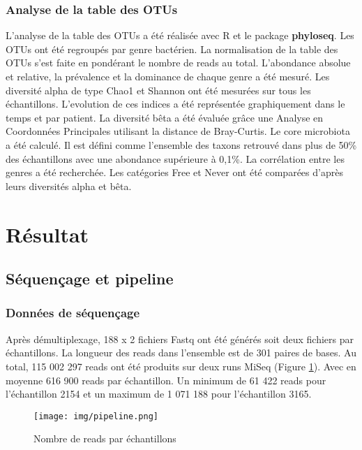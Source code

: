 \documentclass[12pt,a4paper]{article}
\begin{document}
\subsubsection{Analyse de la table des OTUs}
L’analyse de la table des OTUs a été réalisée avec R et le package \textbf{phyloseq}\cite{McMurdie2013}. Les OTUs ont été regroupés par genre bactérien. La normalisation de la table des OTUs s'est faite en pondérant le nombre de reads au total.
L'abondance absolue et relative, la prévalence et la dominance de chaque genre a été mesuré.
Les diversité alpha de type Chao1 et Shannon ont été mesurées sur tous les échantillons. L'evolution de ces indices a été représentée graphiquement dans le temps et par patient.
La diversité bêta a été évaluée grâce une Analyse en Coordonnées Principales utilisant la distance de Bray-Curtis.
Le core microbiota\cite{VanderGast2011} a été calculé. Il est défini comme l’ensemble des taxons retrouvé dans plus de 50\% des échantillons avec une abondance supérieure à 0,1\%.
La corrélation entre les genres a été recherchée.
Les catégories Free et Never ont été comparées d’après leurs diversités alpha et bêta.



\section{Résultat}
\subsection{Séquençage et pipeline}
\subsubsection{Données de séquençage}
Après démultiplexage, 188 x 2 fichiers Fastq ont été générés soit deux fichiers par échantillons.
La longueur des reads dans l'ensemble est de 301 paires de bases.
Au total, 115 002 297 reads ont été produits sur deux runs MiSeq (Figure \ref{readcount}). Avec en moyenne 616 900 reads par échantillon. Un minimum de 61 422 reads pour l’échantillon 2154 et un maximum de 1 071 188 pour l’échantillon 3165.


\begin{figure}[ht]
\begin{center}
\texttt{[image: img/pipeline.png]}\hfill
\end{center}
\caption{Nombre de reads par échantillons}
\label{readcount}
\end{figure}
\end{document}
